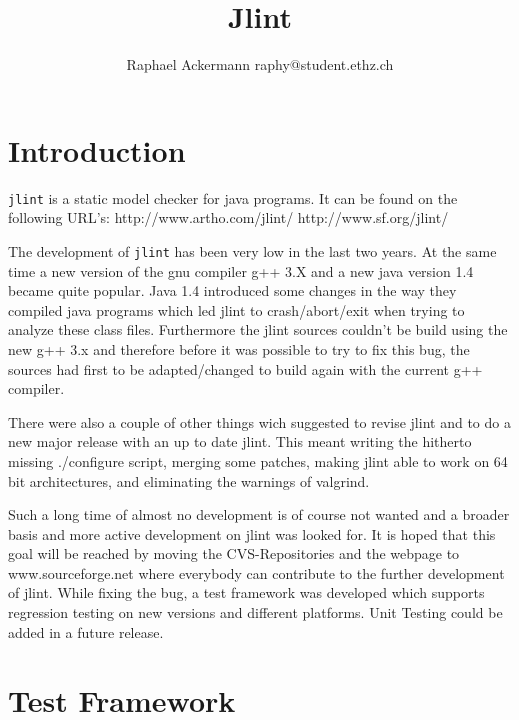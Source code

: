 \documentclass[11pt,twoside,a4paper,draft]{article}
\author{Raphael Ackermann raphy@student.ethz.ch}
\title{Jlint}
\begin{document}
\maketitle

\newpage

\tableofcontents

\newpage

\section {Introduction}

\texttt{jlint} is a static model checker for java programs. \newline
It can be found on the following URL's: 
http://www.artho.com/jlint/ \newline
http://www.sf.org/jlint/ \newline

The development of \texttt{jlint} has been very low in the last two years.
At the same time a new version of the gnu compiler g++ 3.X and a new java
version 1.4 became quite popular. Java 1.4 introduced some changes in the way they
compiled java programs which led jlint to crash/abort/exit when trying to 
analyze these class files. Furthermore the jlint sources couldn't be build
using the new g++ 3.x and therefore before it was possible to try to fix this
bug, the sources had first to be adapted/changed to build again with the 
current g++ compiler.

There were also a couple of other things wich suggested to revise jlint and
to do a new major release with an up to date jlint. This meant writing
the hitherto missing ./configure script, merging some patches, making 
jlint able to work on 64 bit architectures, and eliminating the warnings
of valgrind.

Such a long time of almost no development is of course not wanted and
a broader basis and more active development on jlint was looked for.
It is hoped that this goal will be reached by moving the CVS-Repositories 
and the webpage to www.sourceforge.net where everybody can contribute 
to the further development of jlint.
While fixing the bug, a test framework was developed which supports
regression testing on new versions and different platforms.
Unit Testing could be added in a future release.

\section {Test Framework}
\end{document}
